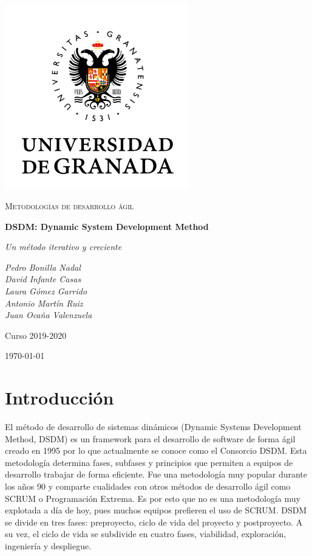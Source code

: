 \documentclass[12pt,a4paper]{article}
\begin{document}
\pgfplotsset{compat=1.15}
\begin{titlepage}
  \centering
  \includegraphics[width=0.6\textwidth]{ugr.png}\par\vspace{1cm}
  {\scshape\large Metodologías de desarrollo ágil \par} \vspace{1cm}
  {\huge\bfseries DSDM: Dynamic System Development Method \par}
  \vspace{0.4cm}
  {\large\itshape Un método iterativo y creciente\\}
  \vspace{0.6cm}
  {\large\itshape  Pedro Bonilla Nadal \\ David Infante Casas \\ Laura Gómez Garrido \\ Antonio Martín Ruiz \\ Juan Ocaña Valenzuela  \par} \vspace{1.00cm}
  Curso 2019-2020 \\
  \vfill

  {\large \today\par}
\end{titlepage}

\tableofcontents
\newpage

\setlength{\parskip}{10pt}

\section{Introducción}
El método de desarrollo de sistemas dinámicos (Dynamic Systems Development Method, DSDM) es un framework para el desarrollo de software de forma ágil creado en 1995 por lo que actualmente se conoce como el Consorcio DSDM. Esta metodología determina fases, subfases y principios que permiten a equipos de desarrollo trabajar de forma eficiente. Fue una metodología muy popular durante los años 90 y comparte cualidades con otros métodos de desarrollo ágil como SCRUM o Programación Extrema. Es por esto que no es una metodología muy explotada a día de hoy, pues muchos equipos prefieren el uso de SCRUM. DSDM se divide en tres fases: preproyecto, ciclo de vida del proyecto y postproyecto. A su vez, el ciclo de vida se subdivide en cuatro fases, viabilidad, exploración, ingeniería y despliegue.
\end{document}
